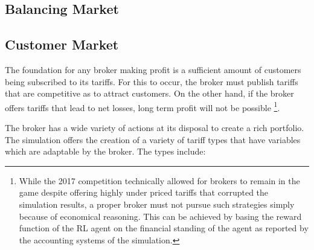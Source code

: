 \subsection{Balancing Market}



\subsection{Customer Market}

The foundation for any broker making profit is a sufficient amount of customers being subscribed to its tariffs. For this to occur, the broker must publish tariffs that are competitive as to attract customers. On the other hand, if the broker offers tariffs that lead to net losses, long term profit will not be possible
\footnote{While the 2017 competition technically allowed for brokers to remain in the game despite offering highly under priced tariffs that corrupted the simulation results, a proper broker must not pursue such strategies simply because of economical reasoning. %
This can be achieved by basing the reward function of the \ac{RL} agent on the financial standing of the agent as reported by the accounting systems of the simulation.}.

The broker has a wide variety of actions at its disposal to create a rich portfolio. The simulation offers the creation of a variety of tariff types that have variables which are adaptable by the broker. The types include:
	
